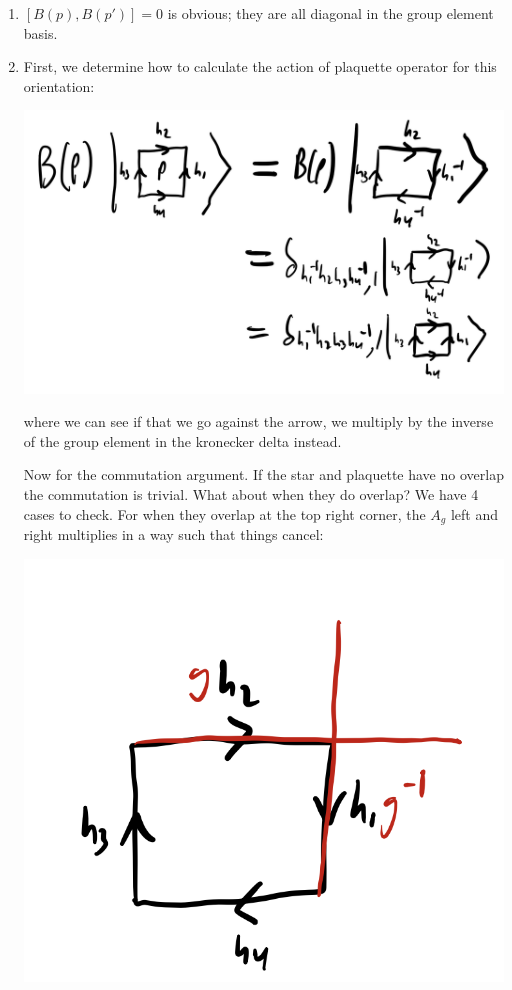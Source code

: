 \begin{enumerate}
    \item $[B(p), B(p')] = 0$ is obvious; they are all diagonal in the group element basis.
    
    \item First, we determine how to calculate the action of plaquette operator for this orientation:

    \begin{center}
        \includegraphics[scale=0.3]{Lectures/Images/lec7-Breverse.png}
    \end{center}

    where we can see if that we go against the arrow, we multiply by the inverse of the group element in the kronecker delta instead.
    
    Now for the commutation argument. If the star and plaquette have no overlap the commutation is trivial. What about when they do overlap? We have 4 cases to check. For when they overlap at the top right corner, the $A_g$ left and right multiplies in a way such that things cancel:

    \begin{center}
        \includegraphics[scale=0.35]{Lectures/Images/lec7-overlap1.png}
    \end{center}


\end{enumerate}
